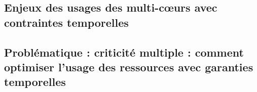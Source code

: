\documentclass[french, a4paper, 11pt, twoside, pdftex]{StyleThese}
\begin{document}
    \subsection{Enjeux des usages des multi-c\oe{}urs avec contraintes temporelles}
    \subsection{Problématique :  criticité multiple : comment optimiser l'usage des ressources avec garanties temporelles}
    
    


\ifdefined{}
\else


\end{document}

